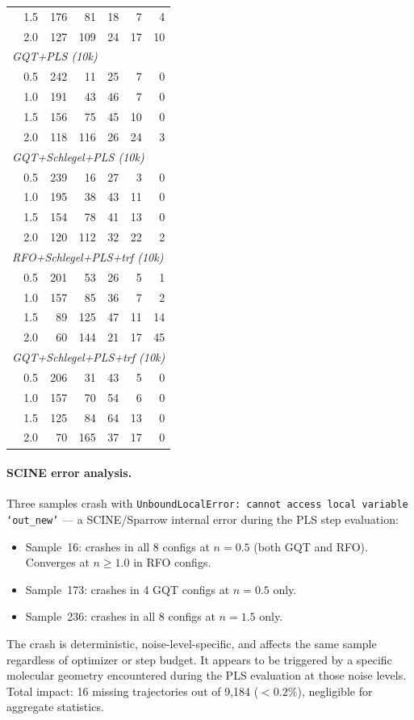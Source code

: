 \documentclass[11pt,a4paper]{article}
\theoremstyle{definition}
\begin{document}
\begin{table}[h]
\begin{tabular}{llrrrrr}
 & 1.5 & 176 & 81 & 18 & 7 & 4 \\
 & 2.0 & 127 & 109 & 24 & 17 & 10 \\
\midrule
\multicolumn{7}{l}{\emph{GQT+PLS (10k)}} \\
 & 0.5 & 242 & 11 & 25 & 7 & 0 \\
 & 1.0 & 191 & 43 & 46 & 7 & 0 \\
 & 1.5 & 156 & 75 & 45 & 10 & 0 \\
 & 2.0 & 118 & 116 & 26 & 24 & 3 \\
\midrule
\multicolumn{7}{l}{\emph{GQT+Schlegel+PLS (10k)}} \\
 & 0.5 & 239 & 16 & 27 & 3 & 0 \\
 & 1.0 & 195 & 38 & 43 & 11 & 0 \\
 & 1.5 & 154 & 78 & 41 & 13 & 0 \\
 & 2.0 & 120 & 112 & 32 & 22 & 2 \\
\midrule
\multicolumn{7}{l}{\emph{RFO+Schlegel+PLS+trf (10k)}} \\
 & 0.5 & 201 & 53 & 26 & 5 & 1 \\
 & 1.0 & 157 & 85 & 36 & 7 & 2 \\
 & 1.5 & 89 & 125 & 47 & 11 & 14 \\
 & 2.0 & 60 & 144 & 21 & 17 & 45 \\
\midrule
\multicolumn{7}{l}{\emph{GQT+Schlegel+PLS+trf (10k)}} \\
 & 0.5 & 206 & 31 & 43 & 5 & 0 \\
 & 1.0 & 157 & 70 & 54 & 6 & 0 \\
 & 1.5 & 125 & 84 & 64 & 13 & 0 \\
 & 2.0 & 70 & 165 & 37 & 17 & 0 \\
\bottomrule
\end{tabular}
\end{table}

\paragraph{SCINE error analysis.}
Three samples crash with \texttt{UnboundLocalError: cannot access local
variable `out\_new'} --- a SCINE/Sparrow internal error during the PLS
step evaluation:
\begin{itemize}[nosep]
  \item Sample~16: crashes in all 8 configs at $n=0.5$ (both GQT and RFO).
    Converges at $n \geq 1.0$ in RFO configs.
  \item Sample~173: crashes in 4 GQT configs at $n=0.5$ only.
  \item Sample~236: crashes in all 8 configs at $n=1.5$ only.
\end{itemize}
The crash is deterministic, noise-level-specific, and affects the same
sample regardless of optimizer or step budget.  It appears to be triggered
by a specific molecular geometry encountered during the PLS evaluation
at those noise levels.  Total impact: 16 missing trajectories out of
9{,}184 ($<0.2\%$), negligible for aggregate statistics.
\end{document}
